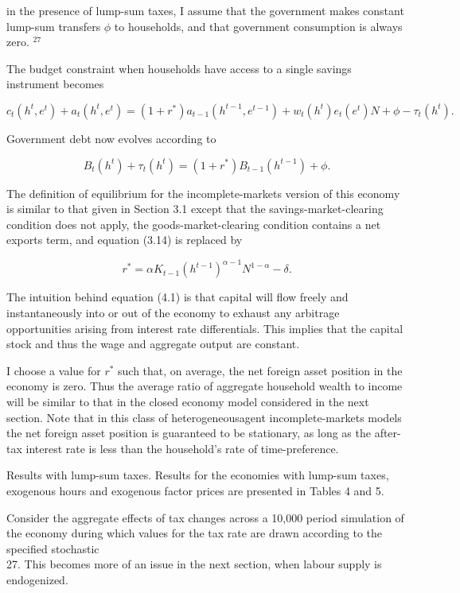 \documentclass[11pt]{article}
\begin{document}
in the presence of lump-sum taxes, I assume that the government makes constant lump-sum transfers $\phi$ to households, and that government consumption is always zero. ${ }^{27}$

The budget constraint when households have access to a single savings instrument becomes

$$
c_{t}\left(h^{t}, e^{t}\right)+a_{t}\left(h^{t}, e^{t}\right)=\left(1+r^{*}\right) a_{t-1}\left(h^{t-1}, e^{t-1}\right)+w_{t}\left(h^{t}\right) e_{t}\left(e^{t}\right) N+\phi-\tau_{t}\left(h^{t}\right) .
$$

Government debt now evolves according to

$$
B_{t}\left(h^{t}\right)+\tau_{t}\left(h^{t}\right)=\left(1+r^{*}\right) B_{t-1}\left(h^{t-1}\right)+\phi .
$$

The definition of equilibrium for the incomplete-markets version of this economy is similar to that given in Section 3.1 except that the savings-market-clearing condition does not apply, the goods-market-clearing condition contains a net exports term, and equation (3.14) is replaced by


\begin{equation*}
r^{*}=\alpha K_{t-1}\left(h^{t-1}\right)^{\alpha-1} N^{1-\alpha}-\delta . \tag{4.1}
\end{equation*}


The intuition behind equation (4.1) is that capital will flow freely and instantaneously into or out of the economy to exhaust any arbitrage opportunities arising from interest rate differentials. This implies that the capital stock and thus the wage and aggregate output are constant.

I choose a value for $r^{*}$ such that, on average, the net foreign asset position in the economy is zero. Thus the average ratio of aggregate household wealth to income will be similar to that in the closed economy model considered in the next section. Note that in this class of heterogeneousagent incomplete-markets models the net foreign asset position is guaranteed to be stationary, as long as the after-tax interest rate is less than the household's rate of time-preference.

Results with lump-sum taxes. Results for the economies with lump-sum taxes, exogenous hours and exogenous factor prices are presented in Tables 4 and 5.

Consider the aggregate effects of tax changes across a 10,000 period simulation of the economy during which values for the tax rate are drawn according to the specified stochastic\\
27. This becomes more of an issue in the next section, when labour supply is endogenized.
\end{document}
